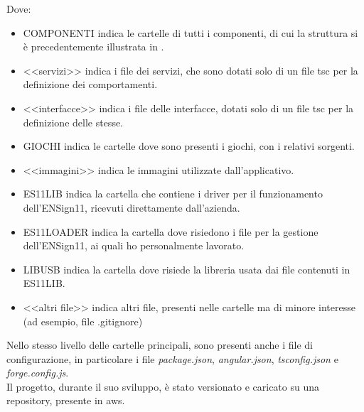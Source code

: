 Dove:
\begin{itemize}
    \item COMPONENTI indica le cartelle di tutti i componenti, di cui la struttura si è precedentemente illustrata in .
    \item <<servizi>> indica i file dei servizi, che sono dotati solo di un file \Gls{tsc} per la definizione dei comportamenti.
    \item <<interfacce>> indica i file delle interfacce, dotati solo di un file \Gls{tsc} per la definizione delle stesse.
    \item GIOCHI indica le cartelle dove sono presenti i giochi, con i relativi sorgenti.
    \item <<immagini>> indica le immagini utilizzate dall'applicativo.
    \item ES11LIB indica la cartella che contiene i driver per il funzionamento dell'ENSign11, ricevuti direttamente dall'azienda.
    \item ES11LOADER indica la cartella dove risiedono i file per la gestione dell'ENSign11, ai quali ho personalmente lavorato.
    \item LIBUSB indica la cartella dove risiede la libreria usata dai file contenuti in ES11LIB.
    \item <<altri file>> indica altri file, presenti nelle cartelle ma di minore interesse (ad esempio, file .gitignore)
\end{itemize}
Nello stesso livello delle cartelle principali, sono presenti anche i file di configurazione, in particolare i file \emph{package.json}, \emph{angular.json}, \emph{tsconfig.json} e \emph{forge.config.js}.\\
Il progetto, durante il suo sviluppo, è stato versionato e caricato su una repository, presente in \gls{aws}.